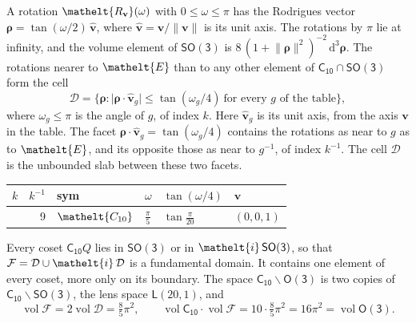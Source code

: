 \documentclass[10pt,a4paper]{article}
\numberwithin{equation}{section}
\newcommand{\eltfont}[1]{{\let\sigma\eltsigma\mathelt{#1}}}
\newcommand{\grp}[1]{\mathsf{#1}}
\newcommand{\cls}[1]{\eltfont{#1}}
\newcommand{\elt}[1]{\eltfont{#1}}
\newcommand{\dirvec}[3]{(#1, #2, #3)}
\newcommand{\unitaxis}{\hat{\mathbf{v}}}
\newcommand{\vv}{\mathbf{v}}
\newcommand{\diff}{\mathrm{d}}
\newcommand{\vol}{\operatorname{vol}}
\newcommand{\rodrigues}{\boldsymbol{\rho}}
\newcommand{\fcell}{\mathcal{D}}
\newcommand{\fdomain}{\mathcal{F}}
\newcommand{\lensspace}[2]{\mathsf{L}(#1, #2)}
\begin{document}
\leavevmode\label{n:vector.rodrigues}\label{n:vector.unitaxis}A rotation $\elt{R_{\vv}}(\omega)$ with $0 \le \omega \le \pi$ has the Rodrigues vector $\rodrigues = \tan(\omega/2)\,\unitaxis$, where $\unitaxis = \vv/\lVert\vv\rVert$ is its unit axis. The rotations by $\pi$ lie at infinity, and the volume element of \href{SO3.pdf}{$\grp{SO(3)}$} is $8\,(1 + \lVert\rodrigues\rVert^2)^{-2}\,\diff^3\rodrigues$.
\leavevmode\label{n:set.cell}The rotations nearer to $\elt{E}$ than to any other element of $\grp{C_{10}} \cap \grp{SO(3)}$ form the cell
\begin{equation}\label{e:cell}\fcell = \bigl\{\rodrigues : \lvert\rodrigues\cdot\unitaxis_g\rvert \le \tan(\omega_g/4)\ \text{for every $g$ of the table}\bigr\},\end{equation}
where $\omega_g \le \pi$ is the angle of $g$, of index $k$. Here $\unitaxis_g$ is its unit axis, from the axis $\vv$ in the table. The facet $\rodrigues\cdot\unitaxis_g = \tan(\omega_g/4)$ contains the rotations as near to $g$ as to $\elt{E}$, and its opposite those as near to $g^{-1}$, of index $k^{-1}$. The cell $\fcell$ is the unbounded slab between these two facets.
{\small{\renewcommand{\arraystretch}{1.3}\begin{longtable}{@{}rrllll@{}}\toprule
$k$ & $k^{-1}$ & sym & $\omega$ & $\tan(\omega/4)$ & $\vv$\\\midrule\endhead
\bottomrule\endfoot\endlastfoot
1 & 9 & $\cls{C_{10}}$ & $\tfrac{\pi}{5}$ & $\tan\tfrac{\pi}{20}$ & $\dirvec{0}{0}{1}$\\
\bottomrule\end{longtable}}}

\leavevmode\label{n:set.fundamental}Every coset $\grp{C_{10}}Q$ lies in \href{SO3.pdf}{$\grp{SO(3)}$} or in $\elt{i}\,\grp{SO(3)}$, so that $\fdomain = \fcell \cup \elt{i}\,\fcell$ is a fundamental domain. It contains one element of every coset, more only on its boundary.
\leavevmode\label{n:set.lens}The space $\grp{C_{10}}\backslash\grp{O(3)}$ is two copies of $\grp{C_{10}}\backslash\grp{SO(3)}$, the lens space $\lensspace{20}{1}$, and
\begin{equation}\label{e:volume}\vol\fdomain = 2\vol\fcell = \tfrac{8}{5}\pi^2,\qquad \vol\grp{C_{10}}\cdot\vol\fdomain = 10\cdot \tfrac{8}{5}\pi^2 = 16\pi^2 = \vol\grp{O(3)}.\end{equation}
\end{document}
